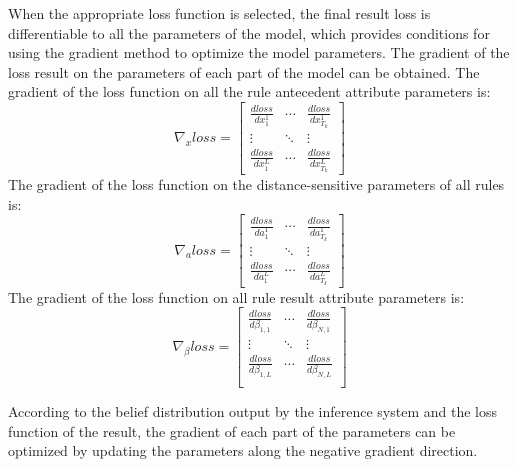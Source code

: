 \documentclass{ieeeaccess}
\begin{document}
When the appropriate loss function is selected, the final result loss is differentiable to all the parameters of the model, which provides conditions for using the gradient method to optimize the model parameters.
The gradient of the loss result on the parameters of each part of the model can be obtained. The gradient of the loss function on all the rule antecedent attribute parameters is:
\begin{equation}
    \nabla_{x}loss=\left[\begin{matrix}
            \frac{dloss}{dx_1^1} & \cdots & \frac{dloss}{dx_{T_k}^1} \\
            \vdots               & \ddots & \vdots                   \\
            \frac{dloss}{dx_1^L} & \cdots & \frac{dloss}{dx_{T_k}^L}
        \end{matrix}\right]
\end{equation}
The gradient of the loss function on the distance-sensitive parameters of all rules is:
\begin{equation}
    \nabla_{a}loss=\left[\begin{matrix}
            \frac{dloss}{da_1^1} & \cdots & \frac{dloss}{da_{T_k}^1} \\
            \vdots               & \ddots & \vdots                   \\
            \frac{dloss}{da_1^L} & \cdots & \frac{dloss}{da_{T_k}^L}
        \end{matrix}\right]
\end{equation}
The gradient of the loss function on all rule result attribute parameters is:
\begin{equation}
    \nabla_{\beta}loss=\left[\begin{matrix}
            \frac{dloss}{d\beta_{1,1}} & \cdots & \frac{dloss}{d\beta_{N,1}} \\
            \vdots                     & \ddots & \vdots                     \\
            \frac{dloss}{d\beta_{1,L}} & \cdots & \frac{dloss}{d\beta_{N,L}} \\
        \end{matrix}\right]
\end{equation}

According to the belief distribution output by the inference system and the loss function of the result,
the gradient of each part of the parameters can be optimized by updating the parameters along the negative gradient direction.
\end{document}
